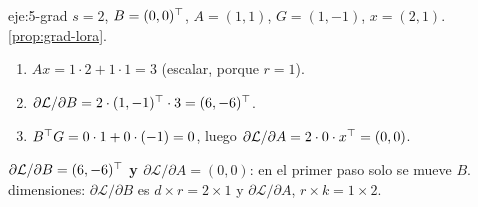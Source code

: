 \begin{solucion}{eje:5-grad}
\datos $s=2$, $B=(0,0)^{\top}$, $A=(1,1)$, $G=(1,-1)$, $x=(2,1)$.
\planteamiento \cref{prop:grad-lora}.
\pasos
\begin{enumerate}[label=\arabic*.]
  \item $Ax=1\cdot 2+1\cdot 1=3$ (escalar, porque $r=1$).
  \item $\partial\mathcal{L}/\partial B=2\cdot(1,-1)^{\top}\cdot 3=(6,-6)^{\top}$.
  \item $B^{\top} G=0\cdot 1+0\cdot(-1)=0$, luego $\partial\mathcal{L}/\partial A=2\cdot 0\cdot x^{\top}=(0,0)$.
\end{enumerate}
\resultado \textbf{$\partial\mathcal{L}/\partial B=(6,-6)^{\top}$ y $\partial\mathcal{L}/\partial A=(0,0)$}: en el primer paso solo se mueve $B$.
\comprobacion dimensiones: $\partial\mathcal{L}/\partial B$ es $d\times r=2\times 1$ y $\partial\mathcal{L}/\partial A$, $r\times k=1\times 2$.
\end{solucion}

